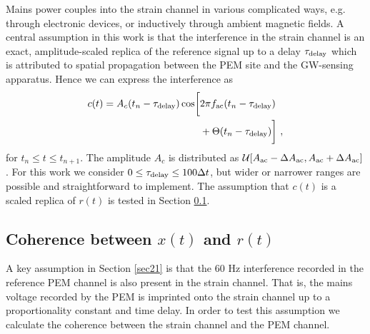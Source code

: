 \documentclass[pra,superscriptaddress,reprint,amsmath,amssymb,nofootinbib]{revtex4-2}
\begin{document}
Mains power couples into the strain channel in various complicated ways, e.g. through electronic devices, or inductively through ambient magnetic fields. A central assumption in this work is that the interference in the strain channel is an exact, amplitude-scaled replica of the reference signal up to a delay $\tau_{\rm delay}$ which is attributed to spatial propagation between the PEM site and the GW-sensing apparatus. Hence we can express the interference as 
 \begin{align}
	c(t) = A_c(t_n - \tau_{\rm delay}) \cos \biggl [ & 2 \pi f_{\rm ac} (t_n - \tau_{\rm delay}) \nonumber \\ 
	&+ \Theta(t_n - \tau_{\rm delay}	) \biggr ] \ ,
	\label{eq:vclutter}
\end{align}
for $t_n \leq t \leq t_{n+1}$. The amplitude $A_c$ is distributed as $\mathcal{U}[A_{\rm ac}- \Delta A_{\rm ac} ,A_{\rm ac} + \Delta A_{\rm ac} ]$. For this work we consider $0 \leq \tau_{\rm delay} \leq 100 \Delta t$, but wider or narrower ranges are possible and straightforward to implement. The assumption that $c(t)$ is a scaled replica of $r(t)$ is tested in Section \ref{sec23}.




\subsection{Coherence between $x(t)$ and $r(t)$}  \label{sec23}
A key assumption in Section \ref{sec21} is that the 60 Hz interference recorded in the reference PEM channel is also present in the strain channel. That is, the mains voltage recorded by the PEM is imprinted onto the strain channel up to a proportionality constant and time delay. In order to test this assumption we calculate the coherence between the strain channel and the PEM channel. \newline 
\end{document}
